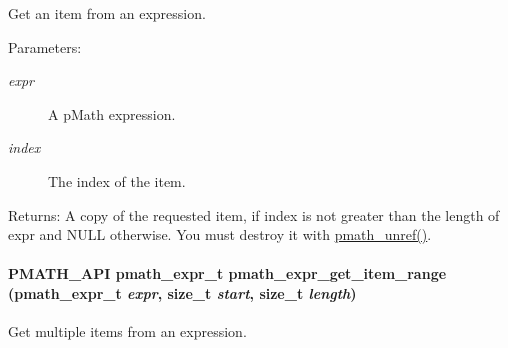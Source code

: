 Get an item from an expression. 

\begin{Desc}
\item[Parameters:]
\begin{description}
\item[{\em expr}]A pMath expression. \item[{\em index}]The index of the item. \end{description}
\end{Desc}
\begin{Desc}
\item[Returns:]A copy of the requested item, if index is not greater than the length of expr and NULL otherwise. You must destroy it with \hyperlink{classpmath__t_54e905402c38940687033b87eb8c6c9f}{pmath\_\-unref()}. \end{Desc}
\hypertarget{group__expressions_ga3ba4e55b5e454f569c7e131653d5b14}{
\paragraph[{pmath\_\-expr\_\-get\_\-item\_\-range}]{\setlength{\rightskip}{0pt plus 5cm}PMATH\_\-API {\bf pmath\_\-expr\_\-t} pmath\_\-expr\_\-get\_\-item\_\-range ({\bf pmath\_\-expr\_\-t} {\em expr}, \/  size\_\-t {\em start}, \/  size\_\-t {\em length})}\hfill}
\label{group__expressions_ga3ba4e55b5e454f569c7e131653d5b14}


Get multiple items from an expression. 

